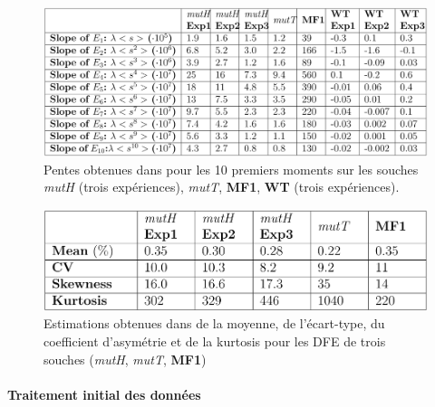 \documentclass[12pt]{article}
\begin{document}
\begin{figure}[h]
  \begin{center}
    \includegraphics[scale=0.3]{img/supmat_slopes.png}
  \end{center}
  \caption{\label{slopes}Pentes obtenues dans \cite{rob} pour les 10 premiers moments sur les souches \emph{mutH} (trois expériences), \emph{mutT}, \textbf{MF1}, \textbf{WT} (trois expériences).}
\end{figure}

\begin{figure}[h]
  \begin{center}
    \includegraphics[scale=0.3]{img/supmat_moments.png}
  \end{center}
  \caption{\label{moments}Estimations obtenues dans \cite{rob} de la moyenne, de l'écart-type, du coefficient d'asymétrie et de la kurtosis pour les DFE de trois souches (\emph{mutH}, \emph{mutT}, \textbf{MF1})}
\end{figure}



\paragraph{Traitement initial des données}
\end{document}
